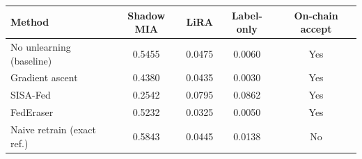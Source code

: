 \begin{tabular}{lcccc}
\toprule
Method & Shadow MIA & LiRA & Label-only & On-chain accept \\
\midrule
No unlearning (baseline) & 0.5455 & 0.0475 & 0.0060 & Yes \\
Gradient ascent & 0.4380 & 0.0435 & 0.0030 & Yes \\
SISA-Fed & 0.2542 & 0.0795 & 0.0862 & Yes \\
FedEraser & 0.5232 & 0.0325 & 0.0050 & Yes \\
Naive retrain (exact ref.) & 0.5843 & 0.0445 & 0.0138 & No \\
\bottomrule
\end{tabular}
